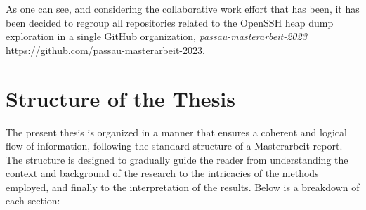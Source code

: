 	As one can see, and considering the collaborative work effort that has been, it has been decided to regroup all repositories related to the OpenSSH heap dump exploration in a single GitHub organization, \textit{passau-masterarbeit-2023} \url{https://github.com/passau-masterarbeit-2023}.

	\section{Structure of the Thesis}


	The present thesis is organized in a manner that ensures a coherent and logical flow of information, following the standard structure of a Masterarbeit report. The structure is designed to gradually guide the reader from understanding the context and background of the research to the intricacies of the methods employed, and finally to the interpretation of the results. Below is a breakdown of each section:
	

